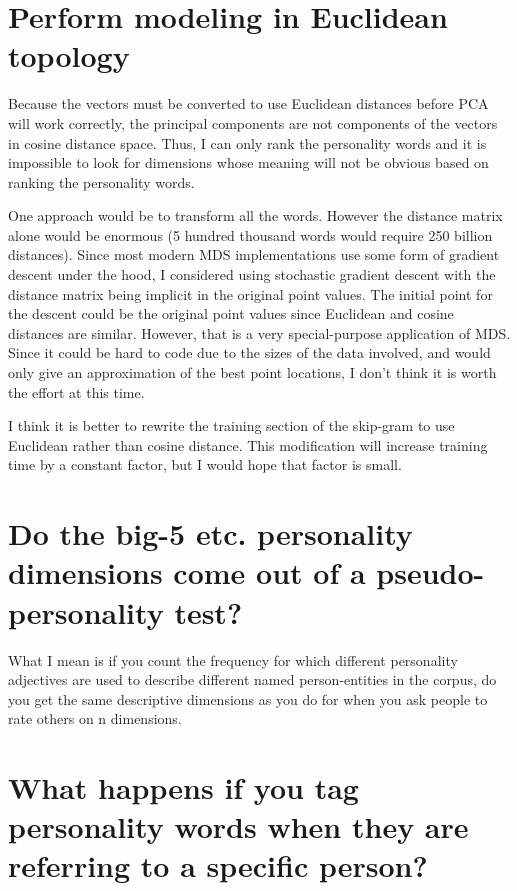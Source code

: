 \documentclass[eric_thesis.tex]{subfiles}
\begin{document}
\section{Perform modeling in Euclidean topology}

Because the vectors must be converted to use Euclidean distances before PCA will work correctly, the principal components are not components of the vectors in cosine distance space. Thus, I can only rank the personality words and it is impossible to look for dimensions whose meaning will not be obvious based on ranking the personality words.

One approach would be to transform all the words. However the distance matrix alone would be enormous (5 hundred thousand words would require 250 billion distances). Since most modern MDS implementations use some form of gradient descent under the hood, I considered using stochastic gradient descent with the distance matrix being implicit in the original point values. The initial point for the descent could be the original point values since Euclidean and cosine distances are similar. However, that is a very special-purpose application of MDS. Since it could be hard to code due to the sizes of the data involved, and would only give an approximation of the best point locations, I don't think it is worth the effort at this time.

I think it is better to rewrite the training section of the skip-gram to use Euclidean rather than cosine distance. This modification will increase training time by a constant factor, but I would hope that factor is small.

\section{Do the big-5 etc. personality dimensions come out of a pseudo-personality test?}
What I mean is if you count the frequency for which different personality adjectives are used to describe different named person-entities in the corpus, do you get the same descriptive dimensions as you do for when you ask people to rate others on n dimensions.

\section{What happens if you tag personality words when they are referring to a specific person?}
\end{document}
